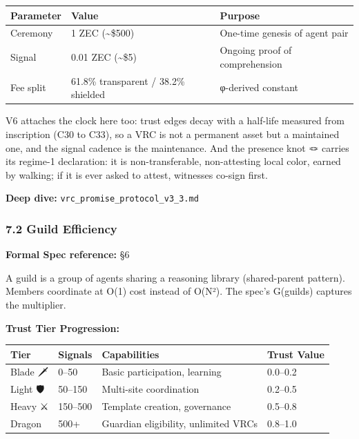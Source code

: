 \documentclass[
]{article}
\newcounter{none} %
\begin{document}
{\def\LTcaptype{none} %
\begin{longtable}[]{@{}lll@{}}
\toprule\noalign{}
Parameter & Value & Purpose \\
\midrule\noalign{}
\endhead
\bottomrule\noalign{}
\endlastfoot
Ceremony & 1 ZEC (\textasciitilde\$500) & One-time genesis of agent
pair \\
Signal & 0.01 ZEC (\textasciitilde\$5) & Ongoing proof of
comprehension \\
Fee split & 61.8\% transparent / 38.2\% shielded & φ-derived constant \\
\end{longtable}
}

V6 attaches the clock here too: trust edges decay with a half-life
measured from inscription (C30 to C33), so a VRC is not a permanent
asset but a maintained one, and the signal cadence is the maintenance.
And the presence knot 🪢 carries its regime-1 declaration: it is
non-transferable, non-attesting local color, earned by walking; if it is
ever asked to attest, witnesses co-sign first.

\textbf{Deep dive:} \texttt{vrc\_promise\_protocol\_v3\_3.md}

\subsubsection{7.2 Guild Efficiency}\label{guild-efficiency}

\textbf{Formal Spec reference:} §6

A guild is a group of agents sharing a reasoning library (shared-parent
pattern). Members coordinate at O(1) cost instead of O(N²). The spec's
G(guilds) captures the multiplier.

\textbf{Trust Tier Progression:}

{\def\LTcaptype{none} %
\begin{longtable}[]{@{}llll@{}}
\toprule\noalign{}
Tier & Signals & Capabilities & Trust Value \\
\midrule\noalign{}
\endhead
\bottomrule\noalign{}
\endlastfoot
Blade 🗡️ & 0--50 & Basic participation, learning & 0.0--0.2 \\
Light 🛡️ & 50--150 & Multi-site coordination & 0.2--0.5 \\
Heavy ⚔️ & 150--500 & Template creation, governance & 0.5--0.8 \\
Dragon 🐉 & 500+ & Guardian eligibility, unlimited VRCs & 0.8--1.0 \\
\end{longtable}
}
\end{document}
